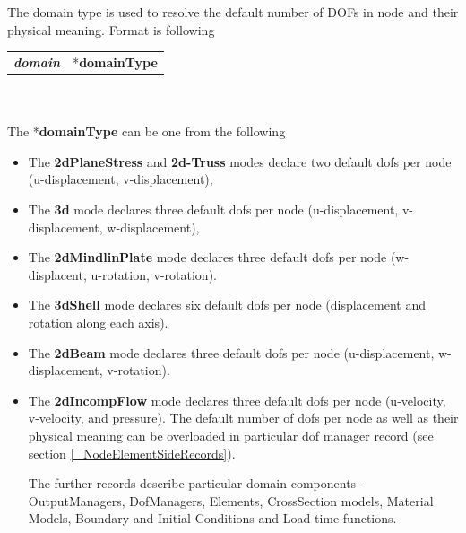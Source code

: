 \documentclass[a4paper]{article}
\makeatletter
\newcommand{\keywordnotype}[1]{\mbox{{\it{\bf{#1}}}}}
\newcommand{\entKeyword}[1]{\mbox{{*{\bf{#1}}}}}
\newcommand{\entKeywordInst}[1]{\mbox{{\bf{{#1}}}}}
\newenvironment{record}[1][]{\begin{tabular}{|ll}}{\end{tabular}\\}
\newcommand{\recentry}[2]{{#1}&{#2}\\}
\newcounter{rcc}
\newenvironment{record}[1][\textwidth]{\setcounter{rcc}{0}\begin{tabular*}{#1}{|ll@{\extracolsep{\fill}}r}}{\end{tabular*}\\}
\newcommand{\recentry}[2]{\ifthenelse{\value{rcc}>0}{&$\backslash$ \\}{\setcounter{rcc}{1}}{#1}&{#2}}
\makeatother
\begin{document}
The domain type is used to resolve the
default number of DOFs in node and their physical meaning. Format is following\\
\begin{record}
  \recentry{\keywordnotype{domain}}{\entKeyword{domainType}}
\end{record}\\
The \entKeyword{domainType} can be one from the following
\begin{itemize}
\item The \entKeywordInst{2dPlaneStress} and \entKeywordInst{2d-Truss}
modes declare two default dofs per node (u-displacement, v-displacement),
\item The \entKeywordInst{3d} mode declares three default dofs per
node (u-displacement, v-displacement, w-displacement),
\item The \entKeywordInst{2dMindlinPlate} mode declares three default
dofs per node (w-displacent, u-rotation, v-rotation).
\item The \entKeywordInst{3dShell} mode declares six default dofs
per node (displacement and rotation along each axis).
\item The \entKeywordInst{2dBeam} mode declares three default dofs per
node (u-displacement, w-displacement, v-rotation).
\item The \entKeywordInst{2dIncompFlow} mode declares three default
  dofs per node (u-velocity, v-velocity, and pressure).
The default number of dofs per node as well as their physical meaning
can be overloaded in particular dof manager record (see section
\ref{_NodeElementSideRecords}).

The further records describe particular domain components - 
OutputManagers, DofManagers, Elements, CrossSection models, Material
Models, Boundary and Initial Conditions and Load time functions.

\end{itemize}
\end{document}
